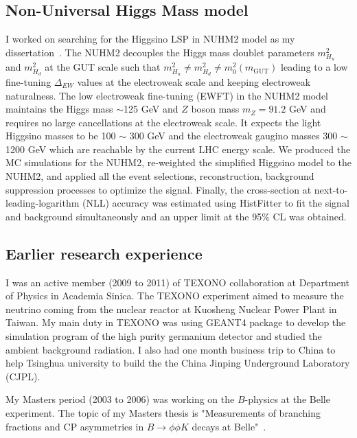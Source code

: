 \documentclass[12pt]{article}
\begin{document}
\subsection{Non-Universal Higgs Mass model}
I worked on searching for the Higgsino LSP in NUHM2 model as my dissertation~\cite{Aaboud:2017leg}.
The NUHM2 decouples the Higgs mass doublet parameters $m^{2}_{H_{u}}$ and $m^{2}_{H_{d}}$ at the GUT scale such that $m^{2}_{H_{u}} \neq m^{2}_{H_{d}} \neq m^{2}_{0}(m_{\textrm{GUT}})$ leading to a low fine-tuning $\Delta_{EW}$ values at the electroweak scale and keeping electroweak naturalness.
The low electroweak fine-tuning (EWFT) in the NUHM2 model maintains the Higgs mass $\sim$125 GeV and $Z$ boson mass $m_{Z} = 91.2$ GeV and requires no large cancellations at the electroweak scale. 
It expects the light Higgsino masses to be 100 $\sim$ 300 GeV and the electroweak gaugino masses 300 $\sim$ 1200 GeV which are reachable by the current LHC energy scale.
We produced the MC simulations for the NUHM2, re-weighted the simplified Higgsino model to the NUHM2, and applied all the event selections, reconstruction, background suppression processes to optimize the signal.
Finally, the cross-section at next-to-leading-logarithm (NLL) accuracy was estimated using HistFitter to fit the signal and background simultaneously and an upper limit at the 95\% CL was obtained.

\subsection{Earlier research experience}
I was an active member (2009 to 2011) of TEXONO collaboration at Department of Physics in Academia Sinica.
The TEXONO experiment aimed to measure the neutrino coming from the nuclear reactor at Kuosheng Nuclear Power Plant in Taiwan.
My main duty in TEXONO was using GEANT4 package to develop the simulation program of the high purity germanium detector and studied the ambient background radiation.
I also had one month business trip to China to help Tsinghua university to build the the China Jinping Underground Laboratory (CJPL).

My Masters period (2003 to 2006) was working on the $B$-physics at the Belle experiment.
The topic of my Masters thesis is "Measurements of branching fractions and CP asymmetries in $B \to \phi \phi K$ decays at Belle"~\cite{Abe:2006qy, Shen:2008pr}.

\end{document}
